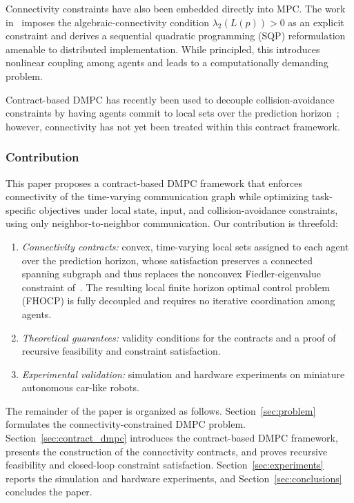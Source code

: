 \documentclass[letterpaper, 10 pt, conference]{ieeeconf}  %
\begin{document}
Connectivity constraints have also been embedded directly into MPC. The work in~\cite{carron2023multi} imposes the algebraic-connectivity condition $\lambda_2(L(p))>0$ as an explicit constraint and derives a sequential quadratic programming (SQP) reformulation amenable to distributed implementation. While principled, this introduces nonlinear coupling among agents and leads to a computationally demanding problem.

Contract-based DMPC has recently been used to decouple
collision-avoidance constraints by having agents commit to local sets over the
prediction horizon~\cite{bodmer2026anytime}; however, connectivity has not yet
been treated within this contract framework.

\subsubsection*{Contribution}
This paper proposes a contract-based DMPC framework that enforces
connectivity of the time-varying communication graph while optimizing
task-specific objectives under local state, input, and collision-avoidance
constraints, using only neighbor-to-neighbor communication.
Our contribution is threefold:
\begin{enumerate}
	\item \emph{Connectivity contracts:} convex, time-varying local sets assigned to each agent over the prediction horizon, whose satisfaction preserves a connected spanning subgraph and thus replaces the nonconvex Fiedler-eigenvalue constraint of~\cite{carron2023multi}. The resulting local finite horizon optimal control problem (FHOCP) is fully decoupled and requires no iterative coordination among agents.
	\item \emph{Theoretical guarantees:} validity conditions for the contracts and a proof of recursive feasibility and constraint satisfaction.
	\item \emph{Experimental validation:} simulation and hardware experiments on miniature autonomous car-like robots.
\end{enumerate}

The remainder of the paper is organized as follows. Section~\ref{sec:problem} formulates the connectivity-constrained DMPC problem. Section~\ref{sec:contract_dmpc} introduces the contract-based DMPC framework, presents the construction of the connectivity contracts, and proves recursive feasibility and closed-loop constraint satisfaction. Section~\ref{sec:experiments} reports the simulation and hardware experiments, and Section~\ref{sec:conclusions} concludes the paper.
\end{document}
